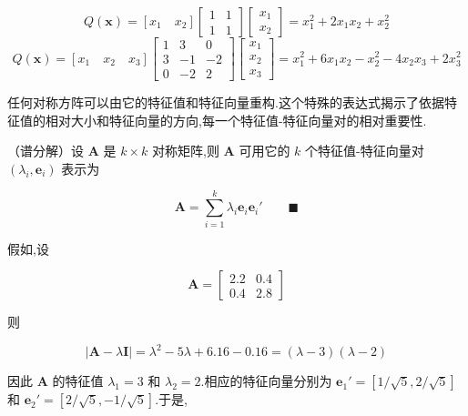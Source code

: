 
\[
Q(\bm{x}) = [x_1 \quad x_2]\begin{bmatrix} 1 & 1 \\ 1 & 1 \end{bmatrix}\begin{bmatrix} x_1 \\ x_2 \end{bmatrix} = x_1^2 + 2x_1x_2 + x_2^2
\]
\[
Q(\bm{x}) = [x_1 \quad x_2 \quad x_3]\begin{bmatrix} 1 & 3 & 0 \\ 3 & -1 & -2 \\ 0 & -2 & 2 \end{bmatrix}\begin{bmatrix} x_1 \\ x_2 \\ x_3 \end{bmatrix} = x_1^2 + 6x_1x_2 - x_2^2 - 4x_2x_3 + 2x_3^2
\]

任何对称方阵可以由它的特征值和特征向量重构.这个特殊的表达式揭示了依据特征值的相对大小和特征向量的方向,每一个特征值-特征向量对的相对重要性.

\quad （谱分解）设 $\bm{A}$ 是 $k \times k$ 对称矩阵,则 $\bm{A}$ 可用它的 $k$ 个特征值-特征向量对 $(\lambda_i, \bm{e}_i)$ 表示为

\[
\bm{A} = \sum_{i=1}^{k}\lambda_i\bm{e}_i\bm{e}_i' \qquad \blacksquare
\]

假如,设

\[
\bm{A} = \begin{bmatrix} 2.2 & 0.4 \\ 0.4 & 2.8 \end{bmatrix}
\]

则

\[
|\bm{A} - \lambda\bm{I}| = \lambda^2 - 5\lambda + 6.16 - 0.16 = (\lambda - 3)(\lambda - 2)
\]

因此 $\bm{A}$ 的特征值 $\lambda_1 = 3$ 和 $\lambda_2 = 2$.相应的特征向量分别为 $\bm{e}_1' = [1/\sqrt{5}, 2/\sqrt{5}]$ 和 $\bm{e}_2' = [2/\sqrt{5}, -1/\sqrt{5}]$.于是,

